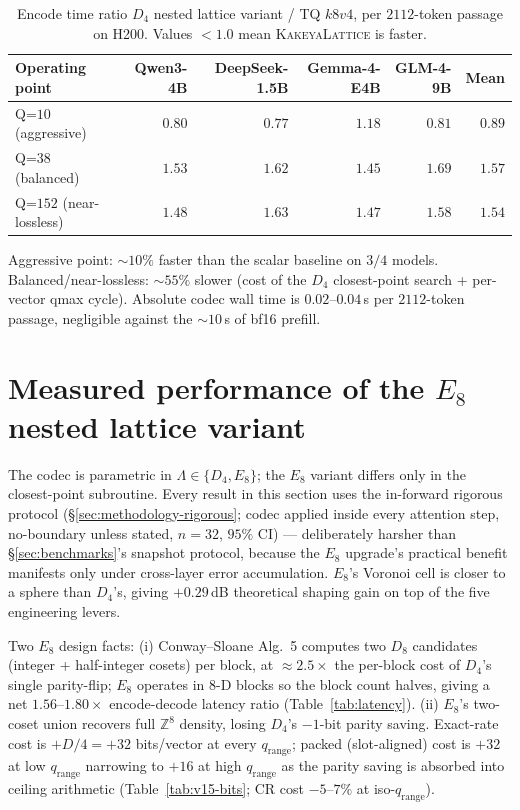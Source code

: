 \documentclass[10pt,a4paper]{article}
\theoremstyle{definition}
\theoremstyle{plain}
\newcommand{\Z}{\mathbb{Z}}
\begin{document}
\begin{table}[H]
\centering
\small
\caption{Encode time ratio $D_4$ nested lattice variant / TQ $k8v4$, per $2112$-token passage
on H200. Values $<1.0$ mean \textsc{KakeyaLattice} is faster.}
\label{tab:speed}
\begin{tabular}{lrrrr|r}
  \toprule
  Operating point & Qwen3-4B & DeepSeek-1.5B & Gemma-4-E4B & GLM-4-9B & Mean \\
  \midrule
  Q=$10$   (aggressive)    & $0.80$ & $0.77$ & $1.18$ & $0.81$ & $\mathbf{0.89}$ \\
  Q=$38$   (balanced)      & $1.53$ & $1.62$ & $1.45$ & $1.69$ & $1.57$ \\
  Q=$152$  (near-lossless) & $1.48$ & $1.63$ & $1.47$ & $1.58$ & $1.54$ \\
  \bottomrule
\end{tabular}
\end{table}

Aggressive point: $\sim\!10\%$ faster than the scalar baseline on
$3/4$ models. Balanced/near-lossless: $\sim\!55\%$ slower (cost of
the $D_4$ closest-point search + per-vector qmax cycle). Absolute
codec wall time is $0.02$--$0.04\,$s per $2112$-token passage,
negligible against the $\sim\!10\,$s of bf16 prefill.

\section{Measured performance of the $E_8$ nested lattice variant}
\label{sec:v15}

The codec is parametric in $\Lambda \in \{D_4, E_8\}$; the $E_8$
variant differs only in the closest-point subroutine. Every result
in this section uses the in-forward rigorous protocol
(\S\ref{sec:methodology-rigorous}; codec applied inside every
attention step, no-boundary unless stated, $n=32$, $95\%$ CI) ---
deliberately harsher than \S\ref{sec:benchmarks}'s snapshot
protocol, because the $E_8$ upgrade's practical benefit manifests
only under cross-layer error accumulation. $E_8$'s Voronoi cell is
closer to a sphere than $D_4$'s, giving $+0.29\,$dB theoretical
shaping gain on top of the five engineering levers.

Two $E_8$ design facts: (i) Conway--Sloane Alg.~5 computes two
$D_8$ candidates (integer + half-integer cosets) per block, at
$\approx 2.5\times$ the per-block cost of $D_4$'s single
parity-flip; $E_8$ operates in $8$-D blocks so the block count
halves, giving a net $1.56$--$1.80\times$ encode-decode latency
ratio (Table~\ref{tab:latency}). (ii) $E_8$'s two-coset union
recovers full $\Z^8$ density, losing $D_4$'s $-1$-bit parity
saving. Exact-rate cost is $+D/4 = +32$ bits/vector at every
$q_\mathrm{range}$; packed (slot-aligned) cost is $+32$ at low
$q_\mathrm{range}$ narrowing to $+16$ at high $q_\mathrm{range}$
as the parity saving is absorbed into ceiling arithmetic
(Table~\ref{tab:v15-bits}; CR cost $-5$--$7\%$ at
iso-$q_\mathrm{range}$).
\end{document}
